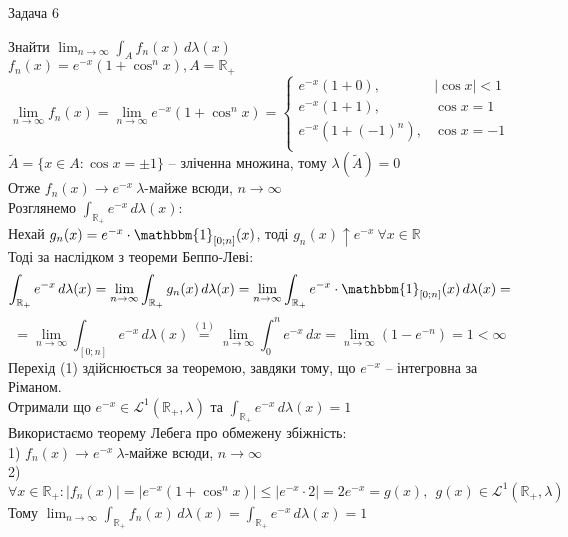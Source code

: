 \documentclass[12 pt]{article}
\begin{document}
\begin{center}
    \Large 
    Задача 6
\end{center}
Знайти $\lim_{n \to \infty}\limits \int_{A} f_n(x) \,d \lambda(x)  $ \\
$f_n(x) = e^{-x}(1+\cos^n{x}), A = \mathbb{R}_+ $ \\ 
$$
\lim_{n \to \infty} f_n(x) =  
\lim_{n \to \infty} e^{-x}(1+\cos^n{x}) =  \begin{cases}
    e^{-x}(1+0), & |\cos{x}| < 1 \\ 
    e^{-x}(1+1), & \cos{x} = 1 \\ 
    e^{-x}(1+(-1)^n), & \cos{x} = - 1 \\ 
\end{cases} 
$$
$\tilde A = \{x \in A : \cos{x} = \pm 1\}$ -- зліченна множина, тому $\lambda(\tilde A) = 0$ \\ 
Отже $f_n(x) \to e^{-x} \ \lambda$-майже всюди, $n \to \infty$ \\ 
Розглянемо $\int_{\mathbb{R}_+} e^{-x} \,d \lambda(x) $: \\ 
Нехай $g_n(x) = e^{-x} \cdot \mathbbm{1}_{[0;n]}(x)$, тоді $g_n(x) \uparrow e^{-x} \  \forall x \in \mathbb{R}$ \\ 
Тоді за наслідком з теореми Беппо-Леві:
$$
\int_{\mathbb{R}_+} e^{-x} \,d \lambda(x) = 
\lim_{n \to \infty}  \int_{\mathbb{R}_+} g_n(x) \,d \lambda(x) = 
\lim_{n \to \infty}  \int_{\mathbb{R}_+} e^{-x} \cdot \mathbbm{1}_{[0;n]}(x)  \,d \lambda(x) = 
$$
$$=
\lim_{n \to \infty}  \int_{[0;n]} e^{-x} \,d \lambda(x)
\stackrel{(1)}{=} \lim_{n \to \infty}  \int_0^n e^{-x} \,dx =
\lim_{n \to \infty}  (1-e^{-n}) = 1 < \infty
$$
Перехід (1) здійснюється за теоремою, завдяки тому, що $e^{-x}$ -- інтегровна за Ріманом. \\ 
Отримали що $e^{-x} \in \mathcal{L}^1(\mathbb{R}_+, \lambda ) $ та $\int_{\mathbb{R}_+} e^{-x} \,d \lambda(x) = 1$ \\ 
Використаємо теорему Лебега про обмежену збіжність: \\ 
1) $f_n(x) \to e^{-x} \  \lambda$-майже всюди, $n \to \infty$  \\ 
2) $\forall x \in \mathbb{R}_+ : |f_n(x)| = |e^{-x}(1+\cos^n{x})| 
\leq |e^{-x} \cdot 2| = 2 e^{-x} = g(x), \ \ g(x) \in \mathcal{L}^1(\mathbb{R}_+, \lambda )$ \\ 
Тому $\lim_{n \to \infty} \limits \int_{\mathbb{R}_+} f_n(x) \,d \lambda(x) = 
\int_{\mathbb{R}_+} e^{-x} \,d \lambda(x) = 1$ 
\end{document}
